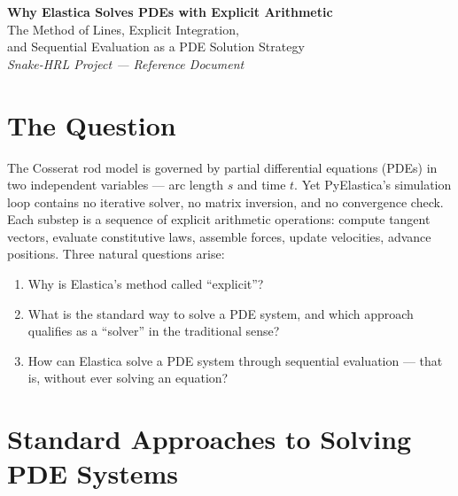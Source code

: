\documentclass[11pt]{article}
\begin{document}

\begin{center}
  {\Large\bfseries Why Elastica Solves PDEs with Explicit Arithmetic} \\[0.5em]
  {\large The Method of Lines, Explicit Integration, \\
  and Sequential Evaluation as a PDE Solution Strategy} \\[1.5em]
  \textit{Snake-HRL Project --- Reference Document}
\end{center}

\vspace{1em}

\section{The Question}
\label{sec:question}

The Cosserat rod model is governed by partial differential equations (PDEs) in two independent variables --- arc length $s$ and time $t$.
Yet PyElastica's simulation loop contains no iterative solver, no matrix inversion, and no convergence check.
Each substep is a sequence of explicit arithmetic operations: compute tangent vectors, evaluate constitutive laws, assemble forces, update velocities, advance positions.
Three natural questions arise:

\begin{enumerate}
  \item Why is Elastica's method called ``explicit''?
  \item What is the standard way to solve a PDE system, and which approach qualifies as a ``solver'' in the traditional sense?
  \item How can Elastica solve a PDE system through sequential evaluation --- that is, without ever solving an equation?
\end{enumerate}

\section{Standard Approaches to Solving PDE Systems}
\label{sec:approaches}
\end{document}
